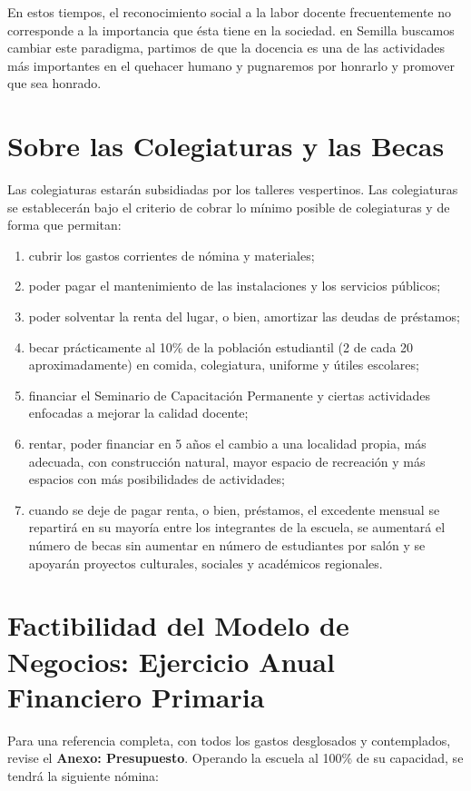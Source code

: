 \documentclass[10pt,letterpaper,oneside]{book}
\begin{document}
En estos tiempos, el reconocimiento social a la labor docente frecuentemente no corresponde a la importancia que ésta tiene en la sociedad. en Semilla buscamos cambiar este paradigma, partimos de que la docencia es una de las actividades más importantes en el quehacer humano y pugnaremos por honrarlo y promover que sea honrado.

\section{Sobre las Colegiaturas y las Becas}

Las colegiaturas estarán subsidiadas por los talleres vespertinos. Las colegiaturas se establecerán bajo el criterio de cobrar lo mínimo posible de colegiaturas y de forma que permitan:
\begin{enumerate}
\item cubrir los gastos corrientes de nómina y materiales;
\item poder pagar el mantenimiento de las instalaciones y los servicios públicos;
\item poder solventar la renta del lugar, o bien, amortizar las deudas de préstamos;
\item becar prácticamente al 10\% de la población estudiantil (2 de cada 20 aproximadamente) en comida, colegiatura, uniforme y útiles escolares;
\item financiar el Seminario de Capacitación Permanente y ciertas actividades enfocadas a mejorar la calidad docente;
\item rentar, poder financiar en 5 años el cambio a una localidad propia, más adecuada, con construcción natural, mayor espacio de recreación y más espacios con más posibilidades de actividades;
\item cuando se deje de pagar renta, o bien, préstamos, el excedente mensual se repartirá en su mayoría entre los integrantes de la escuela, se aumentará el número de becas sin aumentar en número de estudiantes por salón y se apoyarán proyectos culturales, sociales y académicos regionales.
\end{enumerate}


\section{Factibilidad del Modelo de Negocios: Ejercicio Anual Financiero Primaria}

Para una referencia completa, con todos los gastos desglosados y contemplados, revise el {\bf Anexo: Presupuesto}. Operando la escuela al 100\% de su capacidad, se tendrá la siguiente nómina:
\end{document}

